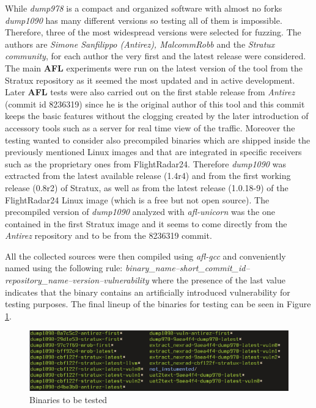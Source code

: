 \documentclass[../main.tex]{subfiles}
\begin{document}
While \textit{dump978} is a compact and organized software with almost no forks
\textit{dump1090} has many different versions so testing all of them is
impossible. Therefore, three of the most widespread versions were selected for
fuzzing. The authors are \textit{Simone Sanfilippo (Antirez), MalcommRobb} and
the \textit{Stratux community}, for each author the very first and the latest
release were considered. The main \textbf{AFL} experiments were run on the
latest version of the tool from the Stratux repository as it seemed the most
updated and in active development. Later \textbf{AFL} tests were also carried
out on the first stable release from \textit{Antirez} (commit id 8236319) since
he is the original author of this tool and this commit keeps the basic features
without the clogging created by the later introduction of accessory tools such
as a server for real time view of the traffic. Moreover the testing wanted to
consider also precompiled binaries which are shipped inside the previously
mentioned Linux images and that are integrated in specific receivers such as the
proprietary ones from FlightRadar24. Therefore \textit{dump1090} was extracted
from the latest available release (1.4r4) and from the first working release
(0.8r2) of Stratux, as well as from the latest release (1.0.18-9) of the
FlightRadar24 Linux image (which is a free but not open source). The precompiled
version of \textit{dump1090} analyzed with \textit{afl-unicorn} was the one
contained in the first Stratux image and it seems to come directly from the
\textit{Antirez} repository and to be from the 8236319 commit.

All the collected sources were then compiled using \textit{afl-gcc} and
conveniently named using the following rule:
\emph{binary\_name--short\_commit\_id--repository\_name--version--vulnerability}
where the presence of the last value indicates that the binary contains an
artificially introduced vulnerability for testing purposes. The final lineup of
the binaries for testing can be seen in Figure \ref{fig:binline}.

 \begin{figure}[htp]
   \centering
   \includegraphics[scale=0.83]{images/binsetup.png}
   \caption{Binaries to be tested}
   \label{fig:binline}
 \end{figure}
\end{document}
